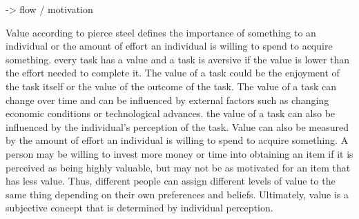 
 -> flow / motivation

Value  according to pierce steel  defines the importance of something to an individual or the amount of effort
 an individual is willing to spend to acquire something.
every task has a value and a task is aversive if the value is lower than the effort needed to complete it.
The value of a task could be the enjoyment of the task itself or the value of the outcome of the task.
The value of a task can change over time and can be influenced by external factors such as changing economic conditions or technological advances.
the value of a task can also be influenced by the individual's perception of the task.
Value can also be measured by the amount of effort an individual is willing to spend to acquire something.
A person may be willing to invest more money or time into obtaining an item if it is perceived as being highly valuable,
but may not be as motivated for an item that has less value.
Thus, different people can assign different levels of value to the same thing depending on their own preferences and beliefs.
Ultimately, value is a subjective concept that is determined by individual perception.\cite{Steel2007}
